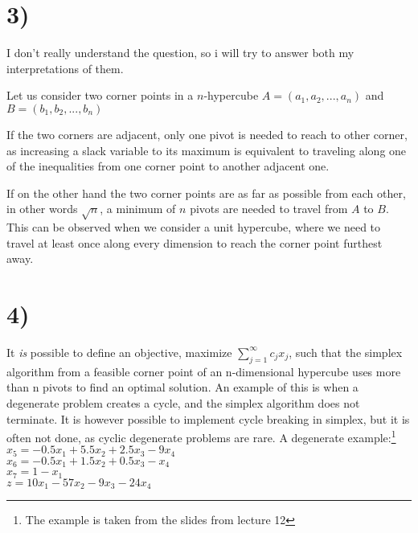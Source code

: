 \section*{3)}
I don't really understand the question, so i will try to answer both my interpretations of them.

Let us consider two corner points in a $n$-hypercube $A=(a_1, a_2, ..., a_n)$ and $B=(b_1, b_2, ..., b_n)$

If the two corners are adjacent, only one pivot is needed to reach to other corner, as increasing a slack variable to its maximum is equivalent to traveling along one of the inequalities from one corner point to another adjacent one.

If on the other hand the two corner points are as far as possible from each other, in other words $\sqrt{n}$, a minimum of $n$ pivots are needed to travel from $A$ to $B$. This can be observed when we consider a unit hypercube, where we need to travel at least once along every dimension to reach the corner point furthest away.

\section*{4)}
It \textit{is} possible to define an objective, maximize $\sum_{j=1}^{\infty} c_j x_j$, such that the simplex algorithm from a
feasible corner point of an n-dimensional hypercube uses more than n pivots to find an optimal solution. An example of this is when a degenerate problem creates a cycle, and the simplex algorithm does not terminate. It is however possible to implement cycle breaking in simplex, but it is often not done, as cyclic degenerate problems are rare. A degenerate example:\footnote{The example is taken from the slides from lecture 12}\\

\noindent
$x_5 = -0.5x_1 + 5.5x_2 + 2.5x_3 - 9x_4$\\ 
$x_6 = -0.5x_1 + 1.5x_2 + 0.5x_3 - x_4$\\
$x_7 = 1 - x_1$\\
$z = 10x_1 - 57x_2 - 9x_3 - 24x_4$


